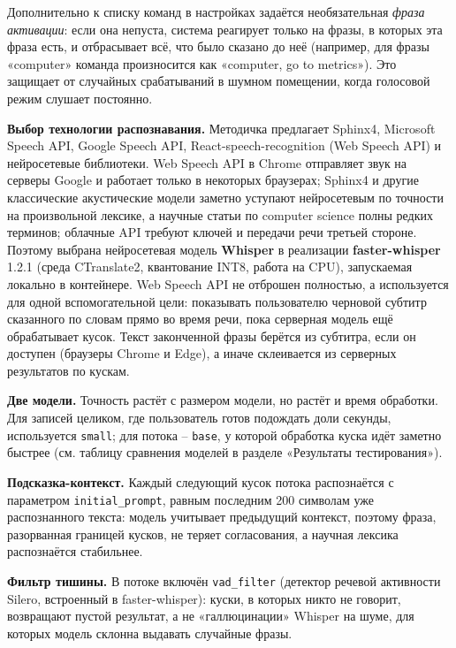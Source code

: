 Дополнительно к списку команд в настройках задаётся необязательная
\emph{фраза активации}: если она непуста, система реагирует только на
фразы, в которых эта фраза есть, и отбрасывает всё, что было сказано до
неё (например, для фразы «computer» команда произносится как «computer,
go to metrics»). Это защищает от случайных срабатываний в шумном
помещении, когда голосовой режим слушает постоянно.


\textbf{Выбор технологии распознавания.} Методичка предлагает Sphinx4,
Microsoft Speech API, Google Speech API, React-speech-recognition (Web
Speech API) и нейросетевые библиотеки. Web Speech API в Chrome отправляет
звук на серверы Google и работает только в некоторых браузерах;
Sphinx4 и другие классические акустические модели заметно уступают
нейросетевым по точности на произвольной лексике, а научные статьи по
computer science полны редких терминов; облачные API требуют ключей и
передачи речи третьей стороне. Поэтому выбрана нейросетевая модель
\textbf{Whisper} в реализации \textbf{faster-whisper} 1.2.1 (среда
CTranslate2, квантование INT8, работа на CPU), запускаемая локально в
контейнере. Web Speech API не отброшен полностью, а используется для
одной вспомогательной цели: показывать пользователю черновой субтитр
сказанного по словам прямо во время речи, пока серверная модель ещё
обрабатывает кусок. Текст законченной фразы берётся из субтитра, если
он доступен (браузеры Chrome и Edge), а иначе склеивается из
серверных результатов по кускам.

\textbf{Две модели.} Точность растёт с размером модели, но растёт и
время обработки. Для записей целиком, где пользователь готов подождать
доли секунды, используется \texttt{small}; для потока -- \texttt{base}, у
которой обработка куска идёт заметно быстрее (см. таблицу
сравнения моделей в разделе «Результаты тестирования»).

\textbf{Подсказка-контекст.} Каждый следующий кусок потока
распознаётся с параметром \texttt{initial\_prompt}, равным последним
200 символам уже распознанного текста: модель учитывает предыдущий
контекст, поэтому фраза, разорванная границей кусков, не теряет
согласования, а научная лексика распознаётся стабильнее.

\textbf{Фильтр тишины.} В потоке включён \texttt{vad\_filter} (детектор
речевой активности Silero, встроенный в faster-whisper): куски, в
которых никто не говорит, возвращают пустой результат, а не
«галлюцинации» Whisper на шуме, для которых модель склонна выдавать
случайные фразы.

